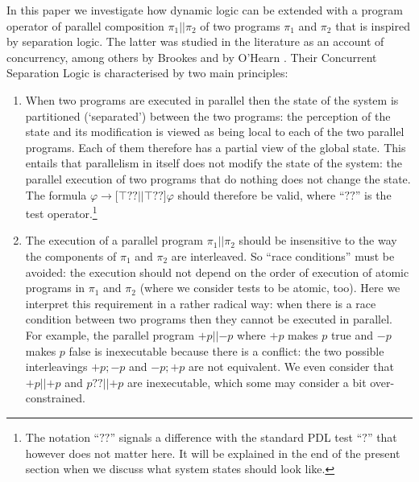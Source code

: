 \documentclass{llncs}
\newcommand{\pll}{ {||} }							%
\newcommand{\testendo}{?\!\!?}			%
\newcommand{\testpdl}{?}				%
\newcommand{\assgntopV}[1]{{\mathtt {+} #1}}
\newcommand{\assgnbotV}[1]{{\mathtt {-} #1}}
\newcommand{\lbox}[1]{ \big[ #1 \big] }
\newcommand{\limp}{ \rightarrow }
\newcommand{\ndet}{\,{\cup}\,}
\renewcommand{\phi}{\varphi}
\begin{document}
In this paper we investigate how dynamic logic can be extended with 
a program operator of parallel composition $\pi_1 \pll \pi_2$ of two programs $\pi_1$ and $\pi_2$ 
that is inspired by separation logic. 
The latter was studied in the literature as an account of concurrency,
among others by Brookes and by O'Hearn %
\cite{OHearn04,Brookes04,Brookes07,BrookesO16}.
Their Concurrent Separation Logic is characterised by two main principles:
\begin{enumerate}
\item
When two programs are executed in parallel then 
the state of the system is partitioned (`separated') between the two programs: 
the perception of the state and its modification is viewed as 
being local to each of the two parallel programs. 
Each of them therefore has a partial view of the global state. 
This entails that parallelism in itself does not modify the state of the system:
the parallel execution of two programs that do nothing does not change the state. 
The formula 
$\phi \limp \lbox{ \top \testendo \pll \top \testendo } \phi$ 
should therefore be valid, where ``$ \testendo $'' is the test operator.\footnote{%
The notation ``$ \testendo $'' signals a difference with the standard PDL test ``$ \testpdl $'' 
that however does not matter here.
It will be explained in the end of the present section
when we discuss what system states should look like.
}
\item
The execution of a parallel program $\pi_1 \pll \pi_2$ should be insensitive to 
the way the components of $\pi_1$ and $\pi_2$ are interleaved. 
So ``race conditions'' \cite{BrookesO16} must be avoided: 
the execution should not depend on the order of execution of atomic programs in $\pi_1$ and $\pi_2$ 
(where we consider tests to be atomic, too). 
Here we interpret this requirement in a rather radical way: 
when there is a race condition between two programs then they cannot be executed in parallel. 
For example, the parallel program $\assgntopV p \pll \assgnbotV p $
where $\assgntopV p$ makes $p$ true and $\assgnbotV p $ makes $p$ false 
is inexecutable because there is a conflict: 
the two possible interleavings 
$\assgntopV p ; \assgnbotV p $ and $\assgnbotV p  ; \assgntopV p $ are not equivalent. 
We even consider that $ \assgntopV p \pll \assgntopV p$ and $ p \testendo \pll \assgntopV p$ are inexecutable, 
which some may consider a bit over-constrained. 
\end{enumerate}
\end{document}
